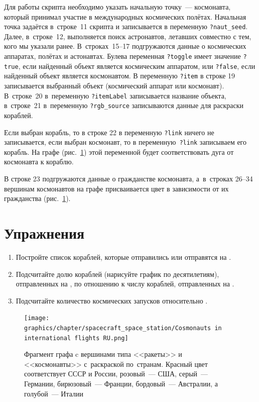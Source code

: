 Для работы скрипта необходимо указать начальную точку~--- космонавта, 
который принимал участие в международных космических полётах. 
Начальная точка задаётся в~строке~11 скрипта и записывается в переменную \lstinline|?naut_seed|. 
Далее, в~строке~12, выполняется поиск астронавтов, 
летавших совместно с тем, кого мы указали ранее. 
В~строках~15--17 подгружаются данные о космических аппаратах, полётах и астонавтах. 
Булева переменная \lstinline|?toggle| имеет значение \lstinline|?true|, 
если найденный объект является космическим аппаратом, 
или \lstinline|?false|, 
если найденный объект является космонавтом. 
В переменную \lstinline|?item| в строке 19 записывается выбранный объект (космический аппарат или космонавт). 
В~строке~20 в~переменную \lstinline|?itemLabel| записывается название объекта, 
в~строке~21 в~переменную \lstinline|?rgb_source| записываются данные для раскраски кораблей. 

Если выбран корабль, то в строке 22 в переменную \lstinline|?link| ничего не записывается, 
если выбран космонавт, то в переменную~\lstinline|?link| записываем его корабль. 
На графе (рис.~\ref{fig:internationalFlights}) этой переменной будет соответствовать дуга от космонавта к кораблю. 

В строке 23 подгружаются данные о гражданстве космонавта, 
а~в~строках 26--34 вершинам космонавтов на графе присваивается цвет в зависимости от их гражданства (рис.~\ref{fig:internationalFlights}). 



\section{Упражнения}
\begin{enumerate}
  \item Постройте список кораблей, которые отправились или отправятся на .
  \item Подсчитайте долю кораблей (нарисуйте график по десятилетиям), 
        отправленных на , 
        по отношению к числу кораблей, отправленных на .
  \item Подсчитайте количество  космических запусков 
      относительно .%
\end{enumerate}



\begin{figure}[h]
\texttt{[image: graphics/chapter/spacecraft\_space\_station/Cosmonauts in international flights RU.png]}%
  \caption[Ракеты и космонавты на графе, 2022 год.]{Фрагмент графа c вершинами типа <<ракеты>> и <<космонавты>> с~раскраской по~странам. Красный цвет соответствует СССР и России, розовый~--- США, серый~--- Германии, бирюзовый~--- Франции, бордовый~--- Австралии, а голубой~--- Италии}
  \label{fig:internationalFlights}%
\end{figure}
